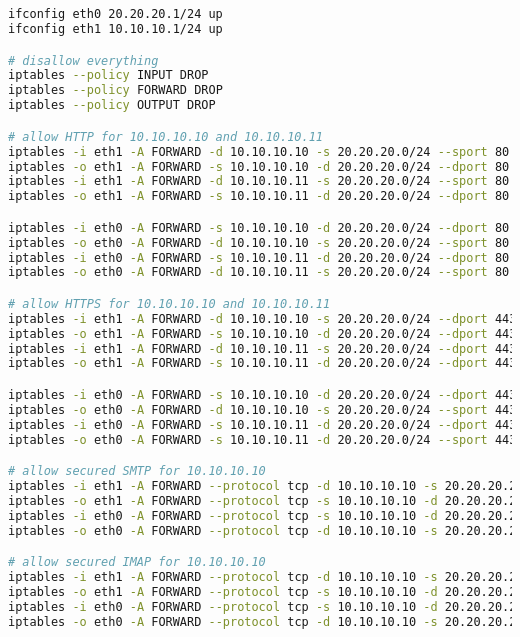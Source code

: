 \documentclass[12pt, a4paper]{article}
\begin{document}
\section{} %
\begin{lstlisting}[language=bash]
ifconfig eth0 20.20.20.1/24 up
ifconfig eth1 10.10.10.1/24 up

# disallow everything
iptables --policy INPUT DROP
iptables --policy FORWARD DROP
iptables --policy OUTPUT DROP

# allow HTTP for 10.10.10.10 and 10.10.10.11
iptables -i eth1 -A FORWARD -d 10.10.10.10 -s 20.20.20.0/24 --sport 80 -j ACCEPT
iptables -o eth1 -A FORWARD -s 10.10.10.10 -d 20.20.20.0/24 --dport 80 -j ACCEPT
iptables -i eth1 -A FORWARD -d 10.10.10.11 -s 20.20.20.0/24 --sport 80 -j ACCEPT
iptables -o eth1 -A FORWARD -s 10.10.10.11 -d 20.20.20.0/24 --dport 80 -j ACCEPT

iptables -i eth0 -A FORWARD -s 10.10.10.10 -d 20.20.20.0/24 --dport 80 -j ACCEPT
iptables -o eth0 -A FORWARD -d 10.10.10.10 -s 20.20.20.0/24 --sport 80 -j ACCEPT
iptables -i eth0 -A FORWARD -s 10.10.10.11 -d 20.20.20.0/24 --dport 80 -j ACCEPT
iptables -o eth0 -A FORWARD -d 10.10.10.11 -s 20.20.20.0/24 --sport 80 -j ACCEPT

# allow HTTPS for 10.10.10.10 and 10.10.10.11
iptables -i eth1 -A FORWARD -d 10.10.10.10 -s 20.20.20.0/24 --dport 443 -j ACCEPT
iptables -o eth1 -A FORWARD -s 10.10.10.10 -d 20.20.20.0/24 --dport 443 -j ACCEPT
iptables -i eth1 -A FORWARD -d 10.10.10.11 -s 20.20.20.0/24 --dport 443 -j ACCEPT
iptables -o eth1 -A FORWARD -s 10.10.10.11 -d 20.20.20.0/24 --dport 443 -j ACCEPT

iptables -i eth0 -A FORWARD -s 10.10.10.10 -d 20.20.20.0/24 --dport 443 -j ACCEPT
iptables -o eth0 -A FORWARD -d 10.10.10.10 -s 20.20.20.0/24 --sport 443 -j ACCEPT
iptables -i eth0 -A FORWARD -s 10.10.10.11 -d 20.20.20.0/24 --dport 443 -j ACCEPT
iptables -o eth0 -A FORWARD -s 10.10.10.11 -d 20.20.20.0/24 --sport 443 -j ACCEPT

# allow secured SMTP for 10.10.10.10
iptables -i eth1 -A FORWARD --protocol tcp -d 10.10.10.10 -s 20.20.20.20.11 --sport 465 --jump ACCEPT
iptables -o eth1 -A FORWARD --protocol tcp -s 10.10.10.10 -d 20.20.20.20.11 --dport 465 --jump ACCEPT
iptables -i eth0 -A FORWARD --protocol tcp -s 10.10.10.10 -d 20.20.20.20.11 --dport 465 --jump ACCEPT
iptables -o eth0 -A FORWARD --protocol tcp -d 10.10.10.10 -s 20.20.20.20.11 --sport 465 --jump ACCEPT

# allow secured IMAP for 10.10.10.10
iptables -i eth1 -A FORWARD --protocol tcp -d 10.10.10.10 -s 20.20.20.20.11 --sport 993 --jump ACCEPT
iptables -o eth1 -A FORWARD --protocol tcp -s 10.10.10.10 -d 20.20.20.20.11 --dport 993 --jump ACCEPT
iptables -i eth0 -A FORWARD --protocol tcp -s 10.10.10.10 -d 20.20.20.20.11 --dport 993 --jump ACCEPT
iptables -o eth0 -A FORWARD --protocol tcp -d 10.10.10.10 -s 20.20.20.20.11 --sport 993 --jump ACCEPT


\end{lstlisting}
\end{document}
